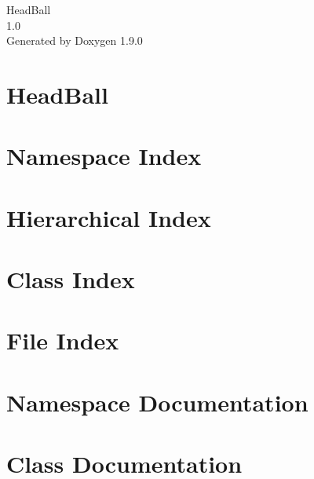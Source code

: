\let\mypdfximage\pdfximage\def\pdfximage{\immediate\mypdfximage}\documentclass[twoside]{book}
\newcommand{\+}{\discretionary{\mbox{\scriptsize$\hookleftarrow$}}{}{}}
\newcommand{\clearemptydoublepage}{%
  \newpage{\pagestyle{empty}\cleardoublepage}%
}
\begin{document}
\raggedbottom

\hypersetup{pageanchor=false,
             bookmarksnumbered=true,
             pdfencoding=unicode
            }
\begin{titlepage}
\vspace*{7cm}
\begin{center}%
{\Large Head\+Ball \\[1ex]\large 1.\+0 }\\
\vspace*{1cm}
{\large Generated by Doxygen 1.9.0}\\
\end{center}
\end{titlepage}
\clearemptydoublepage
{}
\tableofcontents
\clearemptydoublepage
{}
\hypersetup{pageanchor=true}

\chapter{Head\+Ball}
\label{md_README}

\chapter{Namespace Index}

\chapter{Hierarchical Index}

\chapter{Class Index}

\chapter{File Index}

\chapter{Namespace Documentation}



\chapter{Class Documentation}























\end{document}
